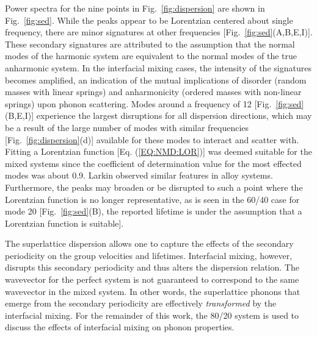 \documentclass[aps,prb,preprint,preprintnumbers,amsmath,amssymb,floatfix,superscriptaddress]{revtex4}
\begin{document}
Power spectra for the nine points in Fig.~\ref{fig:dispersion} are shown in Fig.~\ref{fig:sed}. While the peaks appear to be Lorentzian centered about single frequency, there are minor signatures at other frequencies [Fig.~\ref{fig:sed}(A,B,E,I)]. These secondary signatures are attributed to the assumption that the normal modes of the harmonic system are equivalent to the normal modes of the true anharmonic system. In the interfacial mixing cases, the intensity of the signatures becomes amplified, an indication of the mutual implications of disorder (random masses with linear springs) and anharmonicity (ordered masses with non-linear springs) upon phonon scattering. \cite{RevModPhys.53.175}  Modes around a frequency of 12 [Fig.~\ref{fig:sed}(B,E,I)] experience the largest disruptions for all dispersion directions, which may be a result of the large number of modes with similar frequencies [Fig.~\ref{fig:dispersion}(d)] available for these modes to interact and scatter with.\cite{tamura_isotope_1983} Fitting a Lorentzian function [Eq. (\ref{EQ:NMD:LOR})] was deemed suitable for the mixed systems since the coefficient of determination value \cite{Cowpe20081066} for the most effected modes was about 0.9. Larkin observed similar features in alloy systems.\cite{jason2013vc} Furthermore, the peaks may broaden or be disrupted to such a point where the Lorentzian function is no longer representative, as is seen in the 60/40 case for mode 20 [Fig.~\ref{fig:sed}(B), the reported lifetime is under the assumption that a Lorentzian function is suitable]. 

The superlattice dispersion allows one to capture the effects of the secondary periodicity on the group velocities and lifetimes. Interfacial mixing, however, disrupts this secondary periodicity and thus alters the dispersion relation. The wavevector for the perfect system is not guaranteed to  correspond to the same wavevector in the mixed system. In other words, the superlattice phonons that emerge from the secondary periodicity are effectively \textit{transformed} by the interfacial mixing. For the remainder of this work, the 80/20 system is used to discuss the effects of interfacial mixing on phonon properties.
\renewcommand{\topfraction}{1.0}
\begin{figure*}%
\begin{center}
\renewcommand{\figure}{Fig.}
\caption{(Colour online) Plots of the power spectrums for the selected modes as indicated by the labeled gray square markers in Fig.~\ref{fig:dispersion}(a-c). Dark blue corresponds to a superlattice without mixing, red corresponds to mixing of 80/20 and light blue corresponds to mixing of 60/40. Reported lifetimes calculated from the fitting of the Lorentzian functions (not shown) are identified by the subscripts corresponding to the color (b:dark blue, r:red, c:light blue).}
\label{fig:sed}
\end{center}
\end{figure*}
\end{document}
